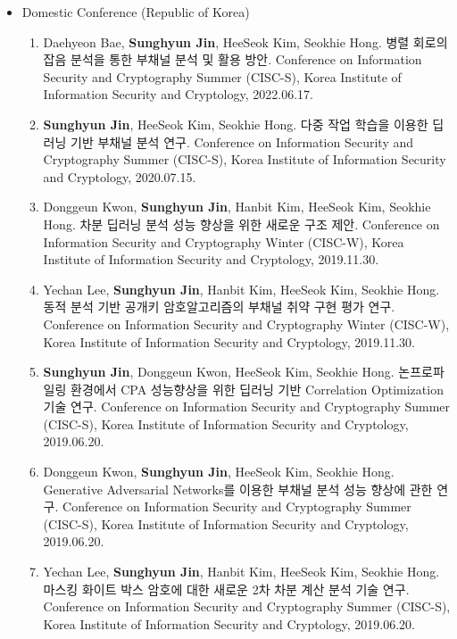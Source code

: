 \documentclass[a4paper,20pt]{article}
\begin{document}
\begin{itemize}
    \item {Domestic Conference (Republic of Korea)}
        \vspace{-6pt}
        \begin{enumerate}
            \item {Daehyeon Bae, \textbf{Sunghyun Jin}, HeeSeok Kim, Seokhie Hong. 병렬 회로의 잡음 분석을 통한 부채널 분석 및 활용 방안. Conference on Information Security and Cryptography Summer (CISC-S), Korea Institute of Information Security and Cryptology, 2022.06.17.}
            \vspace{-2pt}
            \item {\textbf{Sunghyun Jin}, HeeSeok Kim, Seokhie Hong. 다중 작업 학습을 이용한 딥러닝 기반 부채널 분석 연구. Conference on Information Security and Cryptography Summer (CISC-S), Korea Institute of Information Security and Cryptology, 2020.07.15.}
            \vspace{-2pt}
            \item {Donggeun Kwon, \textbf{Sunghyun Jin}, Hanbit Kim, HeeSeok Kim, Seokhie Hong. 차분 딥러닝 분석 성능 향상을 위한 새로운 구조 제안. Conference on Information Security and Cryptography Winter (CISC-W), Korea Institute of Information Security and Cryptology, 2019.11.30.}
            \vspace{-2pt}
            \item {Yechan Lee, \textbf{Sunghyun Jin}, Hanbit Kim, HeeSeok Kim, Seokhie Hong. 동적 분석 기반 공개키 암호알고리즘의 부채널 취약 구현 평가 연구. Conference on Information Security and Cryptography Winter (CISC-W), Korea Institute of Information Security and Cryptology, 2019.11.30.}
            \vspace{-2pt}
            \item {\textbf{Sunghyun Jin}, Donggeun Kwon, HeeSeok Kim, Seokhie Hong. 논프로파일링 환경에서 CPA 성능향상을 위한 딥러닝 기반 Correlation Optimization 기술 연구. Conference on Information Security and Cryptography Summer (CISC-S), Korea Institute of Information Security and Cryptology, 2019.06.20.}
            \vspace{-2pt}
            \item {Donggeun Kwon, \textbf{Sunghyun Jin}, HeeSeok Kim, Seokhie Hong. Generative Adversarial Networks를 이용한 부채널 분석 성능 향상에 관한 연구. Conference on Information Security and Cryptography Summer (CISC-S), Korea Institute of Information Security and Cryptology, 2019.06.20.}
            \vspace{-2pt}
            \item {Yechan Lee, \textbf{Sunghyun Jin}, Hanbit Kim, HeeSeok Kim, Seokhie Hong. 마스킹 화이트 박스 암호에 대한 새로운 2차 차분 계산 분석 기술 연구. Conference on Information Security and Cryptography Summer (CISC-S), Korea Institute of Information Security and Cryptology, 2019.06.20.}

\end{enumerate}
\end{itemize}
\end{document}
